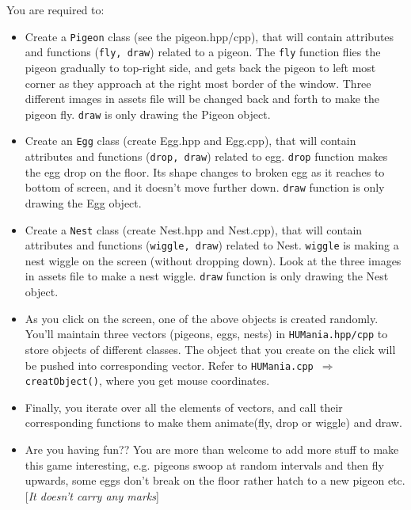 \documentclass[a4paper,12pt]{article}
\begin{document}
	 You are required to:
	 \begin{itemize}
	 	\item Create a \texttt{Pigeon} class (see the pigeon.hpp/cpp), that will contain attributes and functions (\texttt{fly, draw}) related to a pigeon. The \texttt{fly} function flies the pigeon gradually to top-right side, and gets back the pigeon to left most corner as they approach at the right most border of the window. Three different images in assets file will be changed back and forth to make the pigeon fly. \texttt{draw} is only drawing the Pigeon object.
	 	
	 	\item Create an \texttt{Egg} class (create Egg.hpp and Egg.cpp), that will contain attributes and functions (\texttt{drop, draw}) related to egg. \texttt{drop} function makes the egg drop on the floor. Its shape changes to broken egg as it reaches to bottom of screen, and it doesn't move further down. \texttt{draw} function is only drawing the Egg object.
	 	
	 	\item Create a \texttt{Nest} class (create Nest.hpp and Nest.cpp), that will contain attributes and functions (\texttt{wiggle, draw}) related to Nest. \texttt{wiggle} is making a nest wiggle on the screen (without dropping down). Look at the three images in assets file to make a nest wiggle. \texttt{draw} function is only drawing the Nest object.
	 	
	 	\item As you click on the screen, one of the above objects is created randomly. You'll maintain three vectors (pigeons, eggs, nests) in \texttt{HUMania.hpp/cpp} to store objects of different classes. The object that you create on the click will be pushed into corresponding vector. Refer to \texttt{HUMania.cpp $ \Rightarrow $ creatObject()}, where you get mouse coordinates.
	 	
	 	\item Finally, you iterate over all the elements of vectors, and call their corresponding functions to make them animate(fly, drop or wiggle) and draw.
	 	
	 	\item Are you having fun?? You are more than welcome to add more stuff to make this game interesting, e.g. pigeons swoop at random intervals and then fly upwards, some eggs don't break on the floor rather hatch to a new pigeon etc. [\textit{It doesn't carry any marks}]
	 \end{itemize}
 
\end{document}
